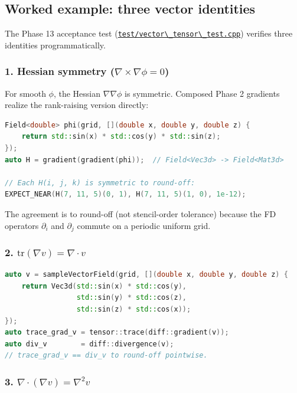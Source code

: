 \subsection{Worked example: three vector
identities}\label{phase13-identities}

The Phase 13 acceptance test
(\href{../../../test/vector_tensor_test.cpp}{\passthrough{\lstinline!test/vector\_tensor\_test.cpp!}})
verifies three identities programmatically.

\subsubsection{1. Hessian symmetry
(\(\nabla\times\nabla\phi = 0\))}\label{phase13-hessian}

For smooth \(\phi\), the Hessian \(\nabla\nabla\phi\) is symmetric.
Composed Phase 2 gradients realize the rank-raising version directly:

\begin{lstlisting}[language={C++}]
Field<double> phi(grid, [](double x, double y, double z) {
    return std::sin(x) * std::cos(y) * std::sin(z);
});
auto H = gradient(gradient(phi));  // Field<Vec3d> -> Field<Mat3d>

// Each H(i, j, k) is symmetric to round-off:
EXPECT_NEAR(H(7, 11, 5)(0, 1), H(7, 11, 5)(1, 0), 1e-12);
\end{lstlisting}

The agreement is to round-off (not stencil-order tolerance) because
the FD operators \(\partial_i\) and \(\partial_j\) commute on a
periodic uniform grid.

\subsubsection{2.
\(\mathrm{tr}(\nabla v) = \nabla\cdot v\)}\label{phase13-trace}

\begin{lstlisting}[language={C++}]
auto v = sampleVectorField(grid, [](double x, double y, double z) {
    return Vec3d(std::sin(x) * std::cos(y),
                 std::sin(y) * std::cos(z),
                 std::sin(z) * std::cos(x));
});
auto trace_grad_v = tensor::trace(diff::gradient(v));
auto div_v        = diff::divergence(v);
// trace_grad_v == div_v to round-off pointwise.
\end{lstlisting}

\subsubsection{3. \(\nabla\cdot(\nabla v) = \nabla^2
v\)}\label{phase13-vec-laplacian}

